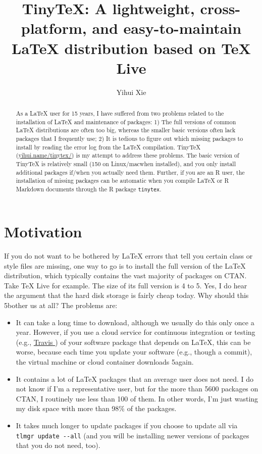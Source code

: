 \documentclass{ltugboat}
\title{TinyTeX: A lightweight, cross-platform, and easy-to-maintain LaTeX
distribution based on TeX Live}
\author{Yihui Xie}
\def\macOS{mac\acro{OS}}
\def\GB{\acro{GB}}
\def\tinytex{\texttt{tinytex}}
\begin{document}
\maketitle

\begin{abstract}
As a \LaTeX{} user for 15 years, I have suffered from two problems related
to the installation of \LaTeX{} and maintenance of packages: 1) The full
versions of common \LaTeX{} distributions are often too big, whereas the
smaller basic versions often lack packages that I frequently use; 2) It
is tedious to figure out which missing packages to install by reading
the error log from the \LaTeX{} compilation. TinyTeX
(\url{yihui.name/tinytex/}) is my attempt to address these
problems. The basic version of TinyTeX is relatively small (150 on
Linux/\macOS when installed), and you only install additional packages
if/when you actually need them. Further, if you are an R user, the
installation of missing packages can be automatic when you compile \LaTeX{}
or R Markdown documents through the R package \tinytex{}.
\end{abstract}

\hypertarget{motivation}{%
\section{Motivation}\label{motivation}}

If you do not want to be bothered by \LaTeX{} errors that tell you certain
class or style files are missing, one way to go is to install the full
version of the \LaTeX{} distribution, which typically contains the vast
majority of packages on CTAN. Take \TeX{} Live for example. The size of its
full version is 4 to 5\GB. Yes, I do hear the argument that the hard disk
storage is fairly cheap today. Why should this 5\GB bother us at all? The
problems are:

\begin{itemize}
\item
  It can take a long time to download, although we usually do this only
  once a year. However, if you use a cloud service for continuous
  integration or testing (e.g., \href{https://travis-ci.org}{Travis })
  of your software package that depends on \LaTeX{}, this can be worse,
  because each time you update your software (e.g., though a 
  commit), the virtual machine or cloud container downloads 5\GB again.
\item
  It contains a lot of \LaTeX{} packages that an average user does not
  need. I do not know if I'm a representative user, but for the more
  than 5600 packages on CTAN, I routinely use less than 100 of them. In
  other words, I'm just wasting my disk space with more than 98\% of the
  packages.
\item
  It takes much longer to update packages if you choose to update all
  via \texttt{tlmgr\ update\ -\/-all} (and you will be installing newer
  versions of packages that you do not need, too).
\end{itemize}
\end{document}
